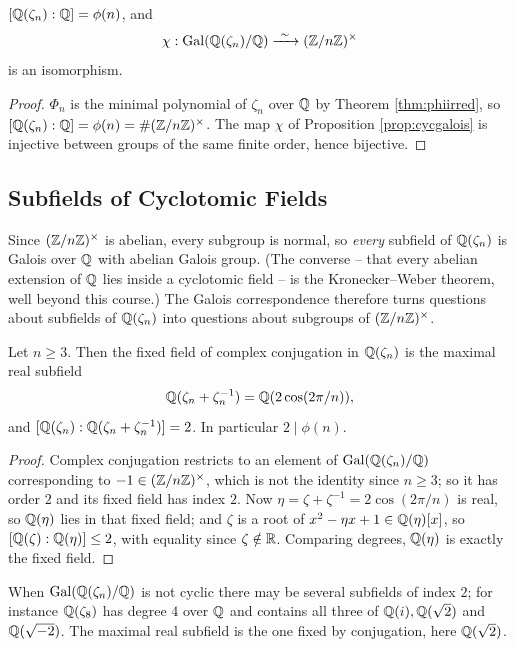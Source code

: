 \documentclass[a4paper]{scrartcl}
\newcommand{\Gal}{\operatorname{Gal}}
\begin{document}
\begin{corollary}\label{cor:cycQ}
	$[\mathbb{Q}(\zeta_n):\mathbb{Q}] = \phi(n)$, and
	$$\chi : \Gal(\Q(\zeta_n)/\Q) \xrightarrow{\ \sim\ } (\Z/n\Z)^\times$$
	is an isomorphism.
\end{corollary}

\begin{proof}
	$\Phi_n$ is the minimal polynomial of $\zeta_n$ over $\mathbb{Q}$ by Theorem \ref{thm:phiirred}, so $[\mathbb{Q}(\zeta_n):\mathbb{Q}] = \phi(n) = \#(\mathbb{Z}/n\mathbb{Z})^\times$. The map $\chi$ of Proposition \ref{prop:cycgalois} is injective between groups of the same finite order, hence bijective.
\end{proof}

\subsection{Subfields of Cyclotomic Fields}

Since $(\mathbb{Z}/n\mathbb{Z})^\times$ is abelian, every subgroup is normal, so \emph{every} subfield of $\mathbb{Q}(\zeta_n)$ is Galois over $\mathbb{Q}$ with abelian Galois group. (The converse -- that every abelian extension of $\mathbb{Q}$ lies inside a cyclotomic field -- is the Kronecker--Weber theorem, well beyond this course.) The Galois correspondence therefore turns questions about subfields of $\mathbb{Q}(\zeta_n)$ into questions about subgroups of $(\mathbb{Z}/n\mathbb{Z})^\times$.

\begin{lemma}\label{lem:realsubfield}
	Let $n \geq 3$. Then the fixed field of complex conjugation in $\mathbb{Q}(\zeta_n)$ is the maximal real subfield
	$$\mathbb{Q}(\zeta_n + \zeta_n^{-1}) = \mathbb{Q}(2\cos(2\pi/n)),$$
	and $[\mathbb{Q}(\zeta_n) : \mathbb{Q}(\zeta_n+\zeta_n^{-1})] = 2$. In particular $2 \mid \phi(n)$.
\end{lemma}

\begin{proof}
	Complex conjugation restricts to an element of $\Gal(\Q(\zeta_n)/\Q)$ corresponding to $-1 \in (\mathbb{Z}/n\mathbb{Z})^\times$, which is not the identity since $n \geq 3$; so it has order $2$ and its fixed field has index $2$. Now $\eta = \zeta+\zeta^{-1} = 2\cos(2\pi/n)$ is real, so $\mathbb{Q}(\eta)$ lies in that fixed field; and $\zeta$ is a root of $x^2 - \eta x + 1 \in \mathbb{Q}(\eta)[x]$, so $[\mathbb{Q}(\zeta):\mathbb{Q}(\eta)]\leq 2$, with equality since $\zeta\notin\mathbb{R}$. Comparing degrees, $\mathbb{Q}(\eta)$ is exactly the fixed field.
\end{proof}

\begin{remark}
	When $\Gal(\Q(\zeta_n)/\Q)$ is not cyclic there may be several subfields of index $2$; for instance $\mathbb{Q}(\zeta_8)$ has degree $4$ over $\mathbb{Q}$ and contains all three of $\mathbb{Q}(i), \mathbb{Q}(\sqrt2)$ and $\mathbb{Q}(\sqrt{-2})$. The maximal real subfield is the one fixed by conjugation, here $\mathbb{Q}(\sqrt 2)$.
\end{remark}
\end{document}
